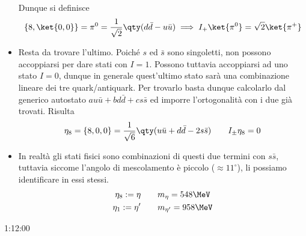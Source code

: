 \begin{itemize}
\begin{equation*}
  \end{equation*}
  Dunque si definisce
  \begin{equation*}
  \{8,\ket{0,0} \}=\pi^0=\frac1{\sqrt2}\qty(d\bar d-u\bar u)\implies I_+\ket{\pi^0}=\sqrt2\ket{\pi^+}
  \end{equation*}
  \item Resta da trovare l'ultimo. Poiché $s$ ed $\bar s$ sono singoletti, non possono accoppiarsi per dare stati con $I=1$. Possono tuttavia accoppiarsi ad uno stato $I=0$, dunque in generale quest'ultimo stato sarà una combinazione lineare dei tre quark/antiquark. Per trovarlo basta dunque calcolarlo dal generico autostato $au\bar u+ b d\bar d + cs\bar s$ ed imporre l'ortogonalità con i due già trovati. Risulta
  \begin{equation*}
  \eta_8=\{8,{0,0}\}=\frac1{\sqrt6}\qty(u\bar u+d\bar d-2s\bar s)\qquad I_\pm\eta_8=0
  \end{equation*}
  \item In realtà gli stati fisici sono combinazioni di questi due termini con $s\bar s$, tuttavia siccome l'angolo di mescolamento è piccolo ($\approx11^\circ$), li possiamo identificare in essi stessi.
  \begin{gather*}
  \eta_8:=\eta\qquad m_\eta=548\MeV\\
  \eta_1:=\eta'\qquad m_{\eta'}=958\MeV
  \end{gather*}
  \end{itemize}
  1:12:00
